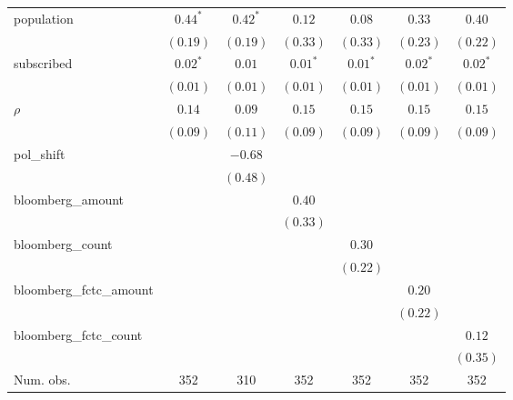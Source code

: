 \begin{table}[!h]
\begin{center}
\begin{tabular}{l c c c c c c }
population              & $0.44^{*}$   & $0.42^{*}$   & $0.12$       & $0.08$       & $0.33$       & $0.40$       \\
                        & $(0.19)$     & $(0.19)$     & $(0.33)$     & $(0.33)$     & $(0.23)$     & $(0.22)$     \\
subscribed              & $0.02^{*}$   & $0.01$       & $0.01^{*}$   & $0.01^{*}$   & $0.02^{*}$   & $0.02^{*}$   \\
                        & $(0.01)$     & $(0.01)$     & $(0.01)$     & $(0.01)$     & $(0.01)$     & $(0.01)$     \\
$\rho$                  & $0.14$       & $0.09$       & $0.15$       & $0.15$       & $0.15$       & $0.15$       \\
                        & $(0.09)$     & $(0.11)$     & $(0.09)$     & $(0.09)$     & $(0.09)$     & $(0.09)$     \\
pol\_shift              &              & $-0.68$      &              &              &              &              \\
                        &              & $(0.48)$     &              &              &              &              \\
bloomberg\_amount       &              &              & $0.40$       &              &              &              \\
                        &              &              & $(0.33)$     &              &              &              \\
bloomberg\_count        &              &              &              & $0.30$       &              &              \\
                        &              &              &              & $(0.22)$     &              &              \\
bloomberg\_fctc\_amount &              &              &              &              & $0.20$       &              \\
                        &              &              &              &              & $(0.22)$     &              \\
bloomberg\_fctc\_count  &              &              &              &              &              & $0.12$       \\
                        &              &              &              &              &              & $(0.35)$     \\
\midrule
Num. obs.               & 352          & 310          & 352          & 352          & 352          & 352          \\

\end{tabular}
\end{center}
\end{table}
